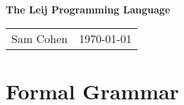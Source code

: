 \documentclass[12pt]{article}
\begin{document}
\begin{Huge}

\noindent
\textbf{\textsf{The Leij Programming Language}}

\end{Huge}
\begin{TopStripeEnv}
\noindent
\begin{tabularx}{\textwidth}{X l}
Sam Cohen & \today \\
\end{tabularx}
\end{TopStripeEnv}

\begin{comment}

\begin{figure*}[h]
	\centering
	\texttt{[image: sample-figure.jpg]}
	\captionof{figure}{Test caption}
\end{figure*}

\begin{wrapfigure}{l}{0.7\linewidth}
	\centering
	\texttt{[image: sample-figure.jpg]}
	\captionof{figure}{Test caption}
\end{wrapfigure}

\begin{Figure}
	\centering
	\texttt{[image: sample-figure.jpg]}
	\captionof{figure}{Test caption}
\end{Figure}

\end{comment}

\newcommand{\Comment}[1]{\textrm{\color{LightGray}#1}}
\newcommand{\Term}[1]{\textbf{\color{ForestGreen}\texttt{#1}}}
\newcommand{\Non}[1]{\textit{#1}}
\newcommand{\Rec}[1]{\underline{\smash{\Non{#1}}}}
\newcommand{\Eq}{$::=$}
\newcommand{\Or}{$|$}
\section{Formal Grammar}
\end{document}
